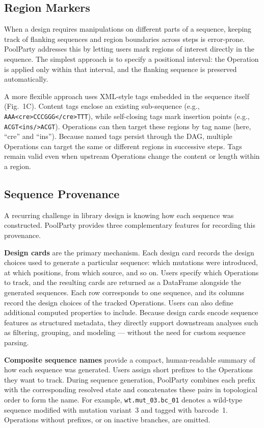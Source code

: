 \documentclass[unnumsec,webpdf,modern,large]{mam-authoring-template}%
\theoremstyle{thmstyleone}%
\theoremstyle{thmstyletwo}%
\theoremstyle{thmstylethree}%
\begin{document}
\subsection{Region Markers}

When a design requires manipulations on different parts of a sequence, keeping track of flanking sequences and region boundaries across steps is error-prone. PoolParty addresses this by letting users mark regions of interest directly in the sequence. The simplest approach is to specify a positional interval: the Operation is applied only within that interval, and the flanking sequence is preserved automatically.

A more flexible approach uses XML-style tags embedded in the sequence itself (Fig.~1C). Content tags enclose an existing sub-sequence (e.g., \texttt{AAA<cre>CCCGGG</cre>TTT}), while self-closing tags mark insertion points (e.g., \texttt{ACGT<ins/>ACGT}). Operations can then target these regions by tag name (here, ``cre'' and ``ins''). Because named tags persist through the DAG, multiple Operations can target the same or different regions in successive steps. Tags remain valid even when upstream Operations change the content or length within a region.

\subsection{Sequence Provenance}

A recurring challenge in library design is knowing how each sequence was constructed. PoolParty provides three complementary features for recording this provenance.

\textbf{Design cards} are the primary mechanism. Each design card records the design choices used to generate a particular sequence: which mutations were introduced, at which positions, from which source, and so on. Users specify which Operations to track, and the resulting cards are returned as a DataFrame alongside the generated sequences. Each row corresponds to one sequence, and its columns record the design choices of the tracked Operations. Users can also define additional computed properties to include. Because design cards encode sequence features as structured metadata, they directly support downstream analyses such as filtering, grouping, and modeling --- without the need for custom sequence parsing.

\textbf{Composite sequence names} provide a compact, human-readable summary of how each sequence was generated. Users assign short prefixes to the Operations they want to track. During sequence generation, PoolParty combines each prefix with the corresponding resolved state and concatenates these pairs in topological order to form the name. For example, \texttt{wt.mut\_03.bc\_01} denotes a wild-type sequence modified with mutation variant~3 and tagged with barcode~1. Operations without prefixes, or on inactive branches, are omitted.
\end{document}
